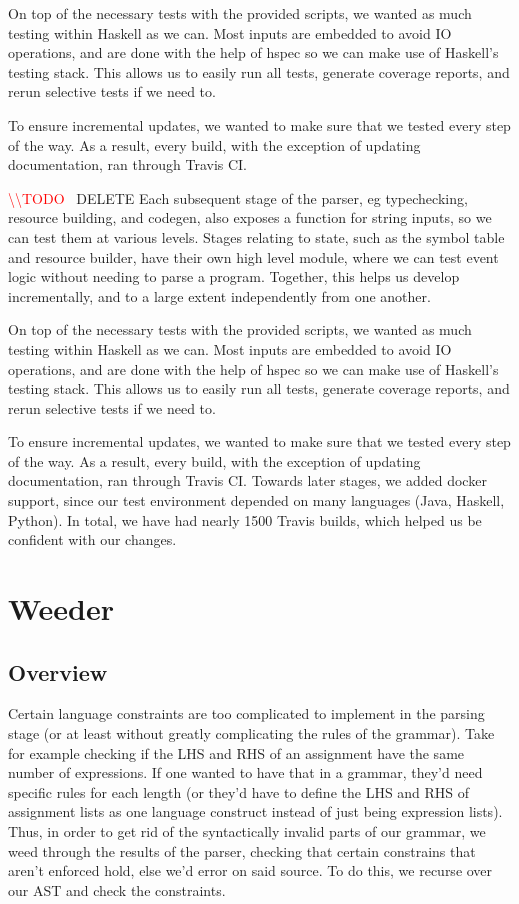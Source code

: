 \documentclass[11pt]{article}
\newcommand{\todo}[0]{\textcolor{red}{\textbackslash\textbackslash TODO \ }}
\begin{document}
On top of the necessary tests with the provided scripts, we wanted as much
testing within Haskell as we can. Most inputs are embedded to avoid IO operations, and are done with the help of hspec so we can make use of Haskell's testing stack. This allows us to easily run all tests,
generate coverage reports, and rerun selective tests if we need to.

To ensure incremental updates, we wanted to make sure that we tested every step of the way. As a result, every build, with the exception of updating documentation, ran through Travis CI.

\todo DELETE
Each subsequent stage of the parser, eg typechecking, resource building, and codegen, also exposes a function for string inputs, so we can test them at various levels.
Stages relating to state, such as the symbol table and resource builder,
have their own high level module, where we can test event logic without
needing to parse a program. Together, this helps us develop incrementally,
and to a large extent independently from one another.

On top of the necessary tests with the provided scripts, we wanted as much
testing within Haskell as we can. Most inputs are embedded to avoid IO operations, and are done with the help of hspec so we can make use of Haskell's testing stack. This allows us to easily run all tests,
generate coverage reports, and rerun selective tests if we need to.

To ensure incremental updates, we wanted to make sure that we tested every step of the way. As a result, every build, with the exception of updating documentation, ran through Travis CI.
Towards later stages, we added docker support, since our test environment depended on many languages (Java, Haskell, Python).
In total, we have had nearly 1500 Travis builds, which helped us be confident with our changes.

\section{Weeder}
\subsection{Overview}
Certain language constraints are too complicated to implement in the
parsing stage (or at least without greatly complicating the rules of
the grammar). Take for example checking if the LHS and RHS of an
assignment have the same number of expressions. If one wanted to have
that in a grammar, they'd need specific rules for each length (or
they'd have to define the LHS and RHS of assignment lists as one
language construct instead of just being expression lists). Thus, in
order to get rid of the syntactically invalid parts of our grammar, we
weed through the results of the parser, checking that certain
constrains that aren't enforced hold, else we'd error on said
source. To do this, we recurse over our AST and check the constraints.
\end{document}

